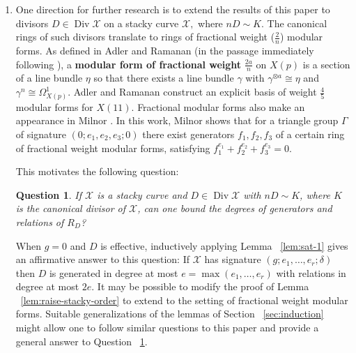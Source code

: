 \documentclass{amsart}
\theoremstyle{plain}
\newtheorem{question}[thm]{Question}
\theoremstyle{definition}
\theoremstyle{remark}
\numberwithin{equation}{section}
\DeclareMathOperator\di{Div}
\newcommand\sx{\mathscr X}
\begin{document}
\begin{enumerate}
	\item One direction for further research is to 
		extend the results of this paper to divisors $D \in \di \sx$ on a 
		stacky curve $\sx,$ where $nD \sim K.$ The canonical rings of such 
		divisors translate to rings of fractional weight ($\frac{2}{n}$) modular 
		forms. As defined in Adler and Ramanan (in the passage immediately 
		following \cite[Corollary 24.5]{adler:moduli}), a {\bf modular form 
		of fractional weight} $\frac{2a}{n}$ on $X(p)$ is a section of a 
		line bundle $\eta$ so that there exists a line bundle $\gamma$ with 
		$\gamma^{\otimes a} \cong \eta$ and $\gamma^{n} \cong \Omega_{X(p)}^
		1$. Adler and Ramanan \cite[Appendix 2]{adler:moduli} construct an 
		explicit basis of weight $\frac{4}{5}$ modular forms for $X(11)$. 
		Fractional modular forms also make an appearance in Milnor \cite[$
		\mathsection$ 6]{milnor:fractional-weight}. In this work, Milnor 
		shows that for a triangle group $\Gamma$ of signature $(0; e_1,e_2,e
		_3; 0)$ there exist generators $f_1,f_2,f_3$ of a certain ring of 
		fractional weight modular forms, satisfying $f_1^{e_1}+f_2^{e_2}+f_3
		^{e_3} = 0$.  

		This motivates the following question:

		\begin{question}
		\label{ques:fractional-weight}
			If $\sx$ is a stacky curve and $D \in \di \sx$ with $nD \sim K$, 
			where $K$ is the canonical divisor of $\sx$, can one bound the 
			degrees of generators and relations of $R_D$?
		\end{question}
		When $g=0$ and $D$ is effective, inductively applying Lemma ~\ref{lem:sat-1}  
		gives an affirmative answer to this question: If $\sx$ has signature 
		$(g; e_1, \ldots, e_r; \delta)$ then $D$ is generated in degree at 
		most $e = \max(e_1, \ldots, e_r)$ with relations in degree at most
		$2e$. 
		It may be possible to modify the proof of Lemma
		~\ref{lem:raise-stacky-order} to extend to the setting of fractional 
		weight modular forms. 
		Suitable generalizations of the 
		lemmas of Section ~\ref{sec:induction} might allow one to 
		follow similar questions to this paper and provide a general 
		answer to Question ~\ref{ques:fractional-weight}.



\end{enumerate}
\end{document}
